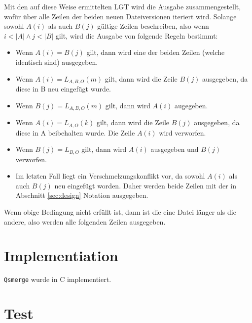\documentclass[a4paper,titlepage,12pt]{scrartcl}
\begin{document}
Mit den auf diese Weise ermittelten LGT wird die Ausgabe zusammengestellt,
wofür über alle Zeilen der beiden neuen Dateiversionen iteriert wird.
Solange sowohl $A(i)$ als auch $B(j)$ gültige Zeilen beschreiben,
also wenn $i < |A| \wedge j < |B|$ gilt,
wird die Ausgabe von folgende Regeln bestimmt:
\begin{itemize}
\item Wenn $A(i) = B(j)$ gilt,
dann wird eine der beiden Zeilen (welche identisch sind) ausgegeben.
\item Wenn $A(i) = L_{A,B,O}(m)$ gilt,
dann wird die Zeile $B(j)$ ausgegeben,
da diese in B neu eingefügt wurde.
\item Wenn $B(j) = L_{A,B,O}(m)$ gilt,
dann wird $A(i)$ augegeben.
\item Wenn $A(i) = L_{A,O}(k)$ gilt,
dann wird die Zeile $B(j)$ ausgegeben,
da diese in A beibehalten wurde.
Die Zeile $A(i)$ wird verworfen.
\item Wenn $B(j) = L_{B,O}$ gilt,
dann wird $A(i)$ ausgegeben und $B(j)$ verworfen.
\item Im letzten Fall liegt ein Verschmelzungskonflikt vor,
da sowohl $A(i)$ als auch $B(j)$ neu eingefügt worden.
Daher werden beide Zeilen mit der in Abschnitt \ref{sec:design} Notation ausgegeben.
\end{itemize}
Wenn obige Bedingung nicht erfüllt ist,
dann ist die eine Datei länger als die andere,
also werden alle folgenden Zeilen ausgegeben.

\section{Implementiation}
\label{sec:implementation}
\texttt{Qsmerge} wurde in C implementiert.

\section{Test}
\label{sec:test}



\end{document}
